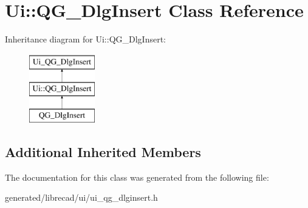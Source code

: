 \hypertarget{classUi_1_1QG__DlgInsert}{\section{Ui\-:\-:Q\-G\-\_\-\-Dlg\-Insert Class Reference}
\label{classUi_1_1QG__DlgInsert}
}
Inheritance diagram for Ui\-:\-:Q\-G\-\_\-\-Dlg\-Insert\-:\begin{figure}[H]
\begin{center}
\leavevmode
\includegraphics[height=3.000000cm]{classUi_1_1QG__DlgInsert}
\end{center}
\end{figure}
\subsection*{Additional Inherited Members}


The documentation for this class was generated from the following file\-:\begin{DoxyCompactItemize}
\item 
generated/librecad/ui/ui\-\_\-qg\-\_\-dlginsert.\-h\end{DoxyCompactItemize}
